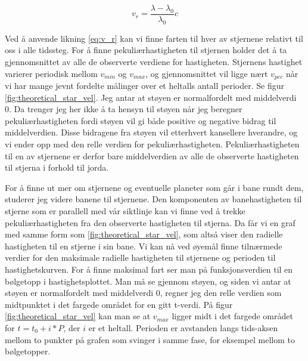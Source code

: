 \documentclass[english,notitlepage]{revtex4-1}  %
\begin{document}
\begin{equation}
  \label{eq:v_r}
  v_r = \frac{\lambda - \lambda_0}{\lambda_0} c
\end{equation}

Ved å anvende likning \ref{eq:v_r} kan vi finne farten til hver av stjernene relativt til
 oss i alle tidssteg. For å finne pekuliærhastigheten til stjernen holder det å ta gjennomsnittet av alle de observerte verdiene for hastigheten. Stjernens hastighet varierer periodisk mellom $v_{min}$ og $v_{max}$, og gjennomsnittet vil ligge nært $v_{pec}$ når vi har mange jevnt fordelte målinger over et heltalls antall perioder. Se figur \ref{fig:theoretical_star_vel}. Jeg antar at støyen er normalfordelt med middelverdi 0. Da trenger jeg her ikke å ta hensyn til støyen når jeg beregner pekuliærhastigheten fordi støyen vil gi både positive og negative bidrag til middelverdien. Disse bidragene fra støyen vil etterhvert kansellere hverandre, og vi ender opp med den relle verdien for pekuliærhastigheten. Pekuliærhastigheten til en av stjernene er derfor bare middelverdien av alle de observerte hastigheten til stjerna i forhold til jorda.

For å finne ut mer om stjernene og eventuelle planeter som går i bane rundt dem, studerer
 jeg videre banene til stjernene. Den komponenten av banehastigheten til stjerne som er parallell med vår siktlinje kan vi finne ved å trekke pekuliærhastigheten fra den observerte hastigheten til stjerna. Da får vi en graf med samme form som \ref{fig:theoretical_star_vel}, som altså viser den radielle hastigheten til en stjerne i sin bane. Vi kan nå ved øyemål finne tilnærmede
 verdier for den maksimale radielle hastigheten til stjernene og perioden til
 hastighetskurven. For å finne maksimal fart ser man på funksjonsverdien til en bølgetopp
 i hastighetsplottet. Man må se gjennom støyen, og siden vi antar at støyen er
 normalfordelt med middelverdi 0, regner jeg den relle verdien som midtpunktet i det
 fargede området for en gitt t-verdi. På figur \ref{fig:theoretical_star_vel} kan man se
 at $v_{max}$ ligger midt i det fargede området for $t = t_0 + i*P$, der $i$ er et heltall. Perioden er avstanden langs tids-aksen mellom to punkter på grafen som svinger i samme fase, for eksempel mellom to bølgetopper.
\end{document}
